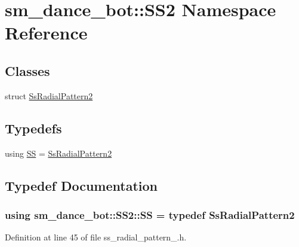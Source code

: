 \hypertarget{namespacesm__dance__bot_1_1SS2}{}\section{sm\+\_\+dance\+\_\+bot\+:\+:S\+S2 Namespace Reference}
\label{namespacesm__dance__bot_1_1SS2}
\subsection*{Classes}
\begin{DoxyCompactItemize}
\item 
struct \hyperlink{structsm__dance__bot_1_1SS2_1_1SsRadialPattern2}{Ss\+Radial\+Pattern2}
\end{DoxyCompactItemize}
\subsection*{Typedefs}
\begin{DoxyCompactItemize}
\item 
using \hyperlink{namespacesm__dance__bot_1_1SS2_a3af437d3b5fb32a00b12e171154d9165}{SS} = \hyperlink{structsm__dance__bot_1_1SS2_1_1SsRadialPattern2}{Ss\+Radial\+Pattern2}
\end{DoxyCompactItemize}


\subsection{Typedef Documentation}
\subsubsection[{\texorpdfstring{SS}{SS}}]{\setlength{\rightskip}{0pt plus 5cm}using {\bf sm\+\_\+dance\+\_\+bot\+::\+S\+S2\+::\+SS} = typedef {\bf Ss\+Radial\+Pattern2}}\hypertarget{namespacesm__dance__bot_1_1SS2_a3af437d3b5fb32a00b12e171154d9165}{}\label{namespacesm__dance__bot_1_1SS2_a3af437d3b5fb32a00b12e171154d9165}


Definition at line 45 of file ss\+\_\+radial\+\_\+pattern\+\_.\+h.


